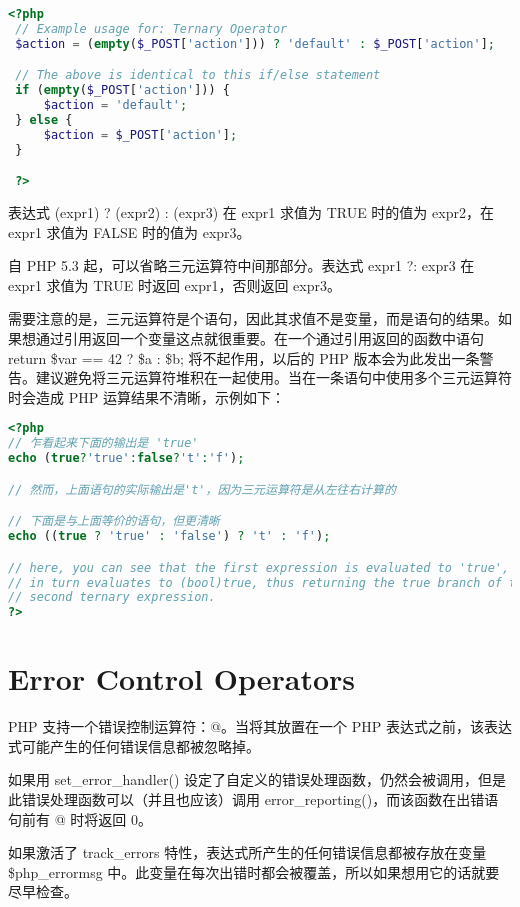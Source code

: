 \begin{lstlisting}[language=PHP]
<?php
 // Example usage for: Ternary Operator
 $action = (empty($_POST['action'])) ? 'default' : $_POST['action'];

 // The above is identical to this if/else statement
 if (empty($_POST['action'])) {
     $action = 'default';
 } else {
     $action = $_POST['action'];
 }

 ?>
\end{lstlisting}

表达式 (expr1) ? (expr2) : (expr3) 在 expr1 求值为 TRUE 时的值为 expr2，在 expr1 求值为 FALSE 时的值为 expr3。

自 PHP 5.3 起，可以省略三元运算符中间那部分。表达式 expr1 ?: expr3 在 expr1 求值为 TRUE 时返回 expr1，否则返回 expr3。

需要注意的是，三元运算符是个语句，因此其求值不是变量，而是语句的结果。如果想通过引用返回一个变量这点就很重要。在一个通过引用返回的函数中语句 return \$var == 42 ? \$a : \$b; 将不起作用，以后的 PHP 版本会为此发出一条警告。建议避免将三元运算符堆积在一起使用。当在一条语句中使用多个三元运算符时会造成 PHP 运算结果不清晰，示例如下：


\begin{lstlisting}[language=PHP]
<?php
// 乍看起来下面的输出是 'true'
echo (true?'true':false?'t':'f');

// 然而，上面语句的实际输出是't'，因为三元运算符是从左往右计算的

// 下面是与上面等价的语句，但更清晰
echo ((true ? 'true' : 'false') ? 't' : 'f');

// here, you can see that the first expression is evaluated to 'true', which
// in turn evaluates to (bool)true, thus returning the true branch of the
// second ternary expression.
?>
\end{lstlisting}


\section{Error Control Operators}

PHP 支持一个错误控制运算符：@。当将其放置在一个 PHP 表达式之前，该表达式可能产生的任何错误信息都被忽略掉。

如果用 set\_error\_handler() 设定了自定义的错误处理函数，仍然会被调用，但是此错误处理函数可以（并且也应该）调用 error\_reporting()，而该函数在出错语句前有 @ 时将返回 0。

如果激活了 track\_errors 特性，表达式所产生的任何错误信息都被存放在变量 \$php\_errormsg 中。此变量在每次出错时都会被覆盖，所以如果想用它的话就要尽早检查。

